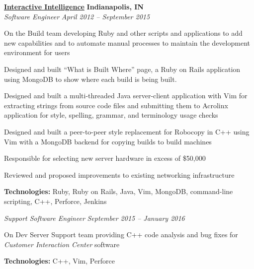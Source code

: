 %
    \headerrow
        {\textbf{\href{https://www.genesys.com/inin}{Interactive Intelligence}}}
        {\textbf{Indianapolis, IN}}
    \\
    \headerrow
        {\emph{Software Engineer}}
        {\emph{April 2012 -- September 2015}}
    \begin{itemize*}
        \item On the Build team developing Ruby and other scripts and applications to add new capabilities and to
                automate manual processes to maintain the development environment for users
        \item Designed and built ``What is Built Where'' page, a Ruby on Rails application using MongoDB to show where
                each build is being built.
         \item Designed and built a multi-threaded Java server-client application with Vim for extracting strings from
                source code files and submitting them to Acrolinx application for style, spelling, grammar, and terminology
                usage checks
        \item Designed and built a peer-to-peer style replacement for Robocopy in C++ using Vim with a MongoDB backend
                for copying builds to build machines
        \item Responsible for selecting new server hardware in excess of \$50,000
        \item Reviewed and proposed improvements to existing networking infrastructure
    \end{itemize*}

    \hspace{1.0em}
    \textbf{Technologies:} Ruby, Ruby on Rails, Java, Vim, MongoDB, command-line scripting, C++, Perforce, Jenkins
    \vspace{0.3em}

    \headerrow
        {\emph{Support Software Engineer}}
        {\emph{September 2015 -- January 2016}}
    \begin{itemize*}
        \item On Dev Server Support team providing C++ code analysis and bug fixes for \emph{Customer Interaction Center} software
    \end{itemize*}

    \hspace{1.0em}
    \textbf{Technologies:} C++, Vim, Perforce
